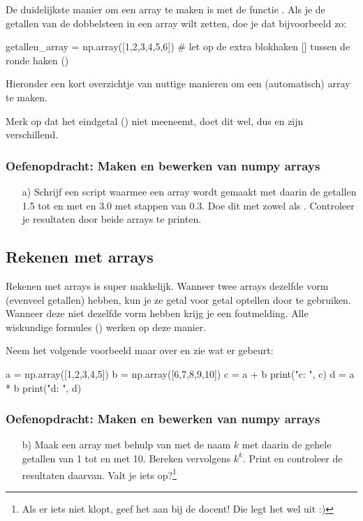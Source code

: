 \documentclass[a4paper,11pt, fleqn]{article}
\begin{document}
De duidelijkste manier om een array te maken is met de functie . Als je de getallen van de dobbelsteen in een array wilt zetten, doe je dat bijvoorbeeld zo:
\begin{python}
getallen_array = np.array([1,2,3,4,5,6]) 
# let op de extra blokhaken [] tussen de ronde haken ()
\end{python}

Hieronder een kort overzichtje van nuttige manieren om een (automatisch) array te maken.


Merk op dat  het eindgetal () niet meeneemt,  doet dit wel, dus  en  zijn verschillend. 

\subsubsection*{Oefenopdracht: Maken en bewerken van numpy arrays}
\begin{itemize}
	\item[a)] Schrijf een script waarmee een array wordt gemaakt met daarin de getallen 1.5 tot en met en 3.0 met stappen van 0.3. Doe dit met zowel  als . Controleer je resultaten door beide arrays te printen.
\end{itemize}

\subsection{Rekenen met arrays}
Rekenen met arrays is super makkelijk. Wanneer twee arrays dezelfde vorm (evenveel getallen) hebben, kun je ze getal voor getal optellen door \pythoninline{+} te gebruiken. Wanneer deze niet dezelfde vorm hebben krijg je een foutmelding. Alle wiskundige formules (\pythoninline{+,-,/,*,**}) werken op deze manier.

Neem het volgende voorbeeld maar over en zie wat er gebeurt:
\begin{python}
a = np.array([1,2,3,4,5])
b = np.array([6,7,8,9,10])
c = a + b
print("c: ", c)
d = a * b
print("d: ", d)
\end{python}

\subsubsection*{Oefenopdracht: Maken en bewerken van numpy arrays}
\begin{itemize}
	\item[b)] Maak een array met behulp van  met de naam $k$ met daarin de gehele getallen van 1 tot en met 10. Bereken vervolgens $k^k$. Print en controleer de resultaten daarvan. Valt je iets op?\footnote{Als er iets niet klopt, geef het aan bij de docent! Die legt het wel uit :)}
\end{itemize}
\end{document}

